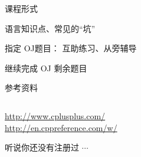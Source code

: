 \begin{frame}{课程形式}
  \begin{description}
    \setlength{\itemsep}{8pt}
    \item[讲解] 语言知识点、常见的``坑'' 
    \item[练习] 指定 OJ题目： 互助练习、从旁辅导
    \item[课后] 继续完成 OJ 剩余题目
  \end{description}
\end{frame}

% 
% 

\begin{frame}{参考资料}
  \begin{columns}
  \end{columns}

  \vspace{0.20cm}
  \pause
  \begin{center}
    \url{http://www.cplusplus.com/}\\[8pt]
    \url{http://en.cppreference.com/w/}
  \end{center}
\end{frame}

\begin{frame}{听说你还没有注册过 $\cdots$}
\end{frame}
